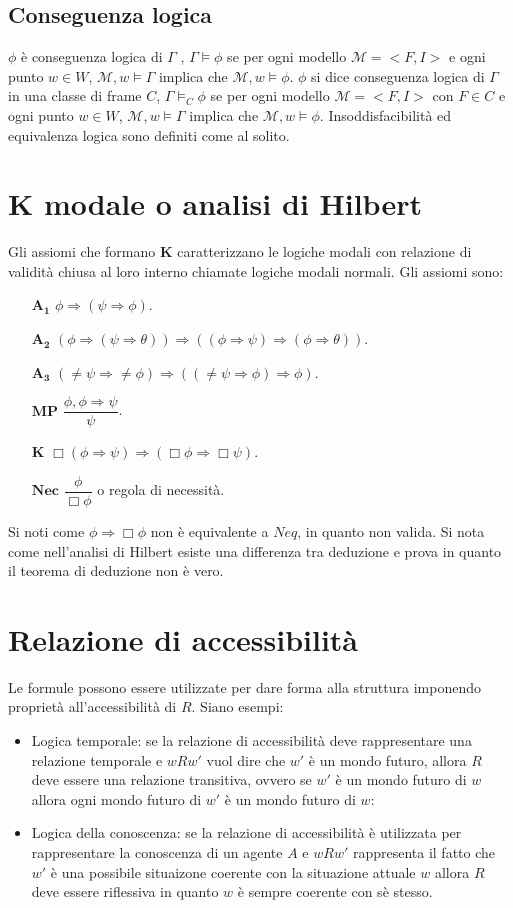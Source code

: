 \subsection{Conseguenza logica}
$\phi$ \`e conseguenza logica di $\Gamma$ , $\Gamma\models\phi$ se per ogni modello $\mathcal{M}=<F,I>$ e ogni punto $w\in W$, $\mathcal{M},w\models\Gamma$ implica che $\mathcal{M}, w
\models\phi$. $\phi$ si dice conseguenza logica di $\Gamma$ in una classe di frame $C$, $\Gamma\models_C\phi$ se per ogni modello $\mathcal{M}=<F,I>$ con $F\in C$ e ogni punto $w\in W$, 
$\mathcal{M},w\models\Gamma$ implica che $\mathcal{M}, w\models\phi$. Insoddisfacibilit\`a ed equivalenza logica sono definiti come al solito.
\section{$\mathbf{K}$ modale o analisi di Hilbert}
Gli assiomi che formano $\mathbf{K}$ caratterizzano le logiche modali con relazione di validit\`a chiusa al loro interno chiamate logiche modali normali. Gli assiomi sono:
\begin{itemize}
\item[$\mathbf{A_1}$] $\phi\Rightarrow(\psi\Rightarrow\phi)$.
\item[$\mathbf{A_2}$] $(\phi\Rightarrow(\psi\Rightarrow\theta))\Rightarrow((\phi\Rightarrow\psi)\Rightarrow(\phi\Rightarrow\theta))$.
\item[$\mathbf{A_3}$] $(\neq\psi\Rightarrow\neq\phi)\Rightarrow((\neq\psi\Rightarrow\phi)\Rightarrow\phi)$.
\item[$\mathbf{MP}$] $\dfrac{\phi, \phi\Rightarrow\psi}{\psi}$.
\item[$\mathbf{K}$] $\Box(\phi\Rightarrow\psi)\Rightarrow(\Box\phi\Rightarrow\Box\psi)$.
\item[$\mathbf{Nec}$] $\dfrac{\phi}{\Box\phi}$ o regola di necessit\`a.
\end{itemize}
Si noti come $\phi\Rightarrow\Box \phi$ non \`e equivalente a $Neq$, in quanto non valida. Si nota come nell'analisi di Hilbert esiste una differenza tra deduzione e prova in quanto il teorema di deduzione non
\`e vero.
\section{Relazione di accessibilit\`a}
Le formule possono essere utilizzate per dare forma alla struttura imponendo propriet\`a all'accessibilit\`a di $R$. Siano esempi:
\begin{itemize}
\item Logica temporale: se la relazione di accessibilit\`a deve rappresentare una relazione temporale e $wRw'$ vuol dire che $w'$ \`e un mondo futuro, allora $R$ deve essere una relazione transitiva, ovvero
se $w'$ \`e un mondo futuro di $w$ allora ogni mondo futuro di $w'$ \`e un mondo futuro di $w$:
\item Logica della conoscenza: se la relazione di accessibilit\`a \`e utilizzata per rappresentare la conoscenza di un agente $A$ e $wRw'$ rappresenta il fatto che $w'$ \`e una possibile situaizone coerente con la
situazione attuale $w$ allora $R$ deve essere riflessiva in quanto $w$ \`e sempre coerente con s\`e stesso. 
\end{itemize}
